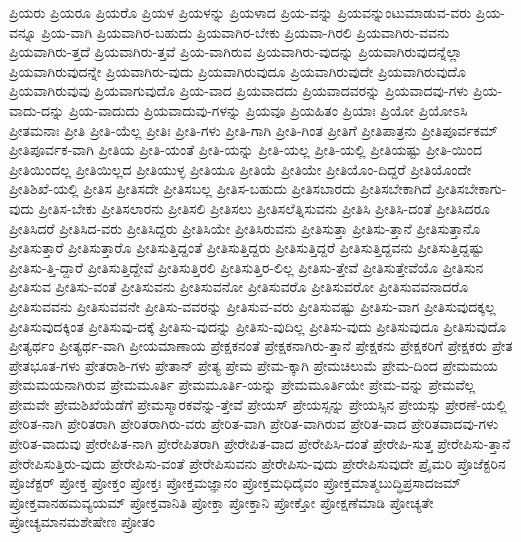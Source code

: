 {ಪ್ರಿಯರು
ಪ್ರಿಯರೂ
ಪ್ರಿಯರೊ
ಪ್ರಿಯಳ
ಪ್ರಿಯಳನ್ನು
ಪ್ರಿಯಳಾದ
ಪ್ರಿಯ-ವನ್ನು
ಪ್ರಿಯವನ್ನುಂಟುಮಾಡುವ-ವರು
ಪ್ರಿಯ-ವನ್ನೂ
ಪ್ರಿಯ-ವಾಗಿ
ಪ್ರಿಯವಾಗಿರ-ಬಹುದು
ಪ್ರಿಯವಾಗಿರ-ಬೇಕು
ಪ್ರಿಯವಾ-ಗಿರಲಿ
ಪ್ರಿಯವಾಗಿರು-ವವನು
ಪ್ರಿಯವಾಗಿರು-ತ್ತದೆ
ಪ್ರಿಯವಾಗಿರು-ತ್ತವೆ
ಪ್ರಿಯ-ವಾಗಿರುವ
ಪ್ರಿಯವಾಗಿರು-ವುದನ್ನು
ಪ್ರಿಯವಾಗಿರುವುದನ್ನೆಲ್ಲಾ
ಪ್ರಿಯವಾಗಿರುವುದನ್ನೇ
ಪ್ರಿಯವಾಗಿರು-ವುದು
ಪ್ರಿಯವಾಗಿರುವುದೂ
ಪ್ರಿಯವಾಗಿರುವುದೇ
ಪ್ರಿಯವಾಗಿರುವುದೊ
ಪ್ರಿಯವಾಗಿರುವುವು
ಪ್ರಿಯವಾಗುವುದೊ
ಪ್ರಿಯ-ವಾದ
ಪ್ರಿಯವಾದದು
ಪ್ರಿಯವಾದವರನ್ನು
ಪ್ರಿಯವಾದವು-ಗಳು
ಪ್ರಿಯ-ವಾದು-ದನ್ನು
ಪ್ರಿಯ-ವಾದುದು
ಪ್ರಿಯವಾದುವು-ಗಳನ್ನು
ಪ್ರಿಯವೂ
ಪ್ರಿಯಹಿತಂ
ಪ್ರಿಯಾಃ
ಪ್ರಿಯೋ
ಪ್ರಿಯೋಽಸಿ
ಪ್ರೀತಮನಾಃ
ಪ್ರೀತಿ
ಪ್ರೀತಿ-ಯೆಲ್ಲ
ಪ್ರೀತಿಃ
ಪ್ರೀತಿ-ಗಳು
ಪ್ರೀತಿ-ಗಾಗಿ
ಪ್ರೀತಿ-ಗಿಂತ
ಪ್ರೀತಿಗೆ
ಪ್ರೀತಿಪಾತ್ರನು
ಪ್ರೀತಿಪೂರ್ವಕಮ್
ಪ್ರೀತಿಪೂರ್ವಕ-ವಾಗಿ
ಪ್ರೀತಿಯ
ಪ್ರೀತಿ-ಯಂತೆ
ಪ್ರೀತಿ-ಯನ್ನು
ಪ್ರೀತಿ-ಯಲ್ಲ
ಪ್ರೀತಿ-ಯಲ್ಲಿ
ಪ್ರೀತಿಯಷ್ಟು
ಪ್ರೀತಿ-ಯಿಂದ
ಪ್ರೀತಿಯಿಂದಲ್ಲ
ಪ್ರೀತಿಯಿಲ್ಲದ
ಪ್ರೀತಿಯುಳ್ಳ
ಪ್ರೀತಿಯೂ
ಪ್ರೀತಿಯೆ
ಪ್ರೀತಿಯೇ
ಪ್ರೀತಿಯೊಂ-ದಿದ್ದರೆ
ಪ್ರೀತಿಯೊಂದೇ
ಪ್ರೀತಿಶಿಖೆ-ಯಲ್ಲಿ
ಪ್ರೀತಿಸ
ಪ್ರೀತಿಸದೇ
ಪ್ರೀತಿಸಬಲ್ಲ
ಪ್ರೀತಿಸ-ಬಹುದು
ಪ್ರೀತಿಸಬಾರದು
ಪ್ರೀತಿಸಬೇಕಾಗಿದೆ
ಪ್ರೀತಿಸಬೇಕಾಗು-ವುದು
ಪ್ರೀತಿಸ-ಬೇಕು
ಪ್ರೀತಿಸಲಾರನು
ಪ್ರೀತಿಸಲಿ
ಪ್ರೀತಿಸಲು
ಪ್ರೀತಿಸಲೆತ್ನಿಸುವನು
ಪ್ರೀತಿಸಿ
ಪ್ರೀತಿಸಿ-ದಂತೆ
ಪ್ರೀತಿಸಿದರೂ
ಪ್ರೀತಿಸಿದರೆ
ಪ್ರೀತಿಸಿದ-ವರು
ಪ್ರೀತಿಸಿದ್ದರು
ಪ್ರೀತಿಸಿಯೇ
ಪ್ರೀತಿಸಿರುವನು
ಪ್ರೀತಿಸುತ್ತಾ
ಪ್ರೀತಿಸು-ತ್ತಾನೆ
ಪ್ರೀತಿಸುತ್ತಾನೊ
ಪ್ರೀತಿಸುತ್ತಾರೆ
ಪ್ರೀತಿಸುತ್ತಾರೊ
ಪ್ರೀತಿಸುತ್ತಿದ್ದಂತೆ
ಪ್ರೀತಿಸುತ್ತಿದ್ದರು
ಪ್ರೀತಿಸುತ್ತಿದ್ದರೆ
ಪ್ರೀತಿಸುತ್ತಿದ್ದವನು
ಪ್ರೀತಿಸುತ್ತಿದ್ದಷ್ಟು
ಪ್ರೀತಿಸು-ತ್ತಿ-ದ್ದಾರೆ
ಪ್ರೀತಿಸುತ್ತಿದ್ದೇವೆ
ಪ್ರೀತಿಸುತ್ತಿರಲಿ
ಪ್ರೀತಿಸುತ್ತಿರ-ಲಿಲ್ಲ
ಪ್ರೀತಿಸು-ತ್ತೇವೆ
ಪ್ರೀತಿಸುತ್ತೇವೆಯೊ
ಪ್ರೀತಿಸುನ
ಪ್ರೀತಿಸುವ
ಪ್ರೀತಿಸು-ವಂತೆ
ಪ್ರೀತಿಸುವನು
ಪ್ರೀತಿಸುವನೋ
ಪ್ರೀತಿಸುವರೊ
ಪ್ರೀತಿಸುವರೋ
ಪ್ರೀತಿಸುವವನಾದರೊ
ಪ್ರೀತಿಸುವವನು
ಪ್ರೀತಿಸುವವನೇ
ಪ್ರೀತಿಸು-ವವರನ್ನು
ಪ್ರೀತಿಸುವ-ವರು
ಪ್ರೀತಿಸುವಷ್ಟು
ಪ್ರೀತಿಸು-ವಾಗ
ಪ್ರೀತಿಸುವುದಕ್ಕಲ್ಲ
ಪ್ರೀತಿಸುವುದಕ್ಕಿಂತ
ಪ್ರೀತಿಸುವು-ದಕ್ಕೆ
ಪ್ರೀತಿಸು-ವುದನ್ನು
ಪ್ರೀತಿಸು-ವುದಿಲ್ಲ
ಪ್ರೀತಿಸು-ವುದು
ಪ್ರೀತಿಸುವುದೂ
ಪ್ರೀತಿಸುವುದೊ
ಪ್ರೀತ್ಯರ್ಥಂ
ಪ್ರೀತ್ಯರ್ಥ-ವಾಗಿ
ಪ್ರೀಯಮಾಣಾಯ
ಪ್ರೇಕ್ಷಕನಂತೆ
ಪ್ರೇಕ್ಷಕನಾಗಿರು-ತ್ತಾನೆ
ಪ್ರೇಕ್ಷಕನು
ಪ್ರೇಕ್ಷಕರಿಗೆ
ಪ್ರೇಕ್ಷಕರು
ಪ್ರೇತ
ಪ್ರೇತಭೂತ-ಗಳು
ಪ್ರೇತರಾಶಿ-ಗಳು
ಪ್ರೇತಾನ್
ಪ್ರೇತ್ಯ
ಪ್ರೇಮ
ಪ್ರೇಮ-ಕ್ಕಾಗಿ
ಪ್ರೇಮಚಿಲುಮೆ
ಪ್ರೇಮ-ದಿಂದ
ಪ್ರೇಮಮಯ
ಪ್ರೇಮಮಯನಾಗಿರುವ
ಪ್ರೇಮಮೂರ್ತಿ
ಪ್ರೇಮಮೂರ್ತಿ-ಯನ್ನು
ಪ್ರೇಮಮೂರ್ತಿಯೇ
ಪ್ರೇಮ-ವನ್ನು
ಪ್ರೇಮವೆಲ್ಲ
ಪ್ರೇಮವೇ
ಪ್ರೇಮಶಿಖೆಯೆಡೆಗೆ
ಪ್ರೇಮಸ್ಮಾರಕವೆನ್ನು-ತ್ತೇವೆ
ಪ್ರೇಯಸ್
ಪ್ರೇಯಸ್ಸನ್ನು
ಪ್ರೇಯಸ್ಸಿನ
ಪ್ರೇಯಸ್ಸು
ಪ್ರೇರಣೆ-ಯಲ್ಲಿ
ಪ್ರೇರಿತ-ನಾಗಿ
ಪ್ರೇರಿತರಾಗಿ
ಪ್ರೇರಿತರಾಗಿರು-ವರು
ಪ್ರೇರಿತ-ವಾಗಿ
ಪ್ರೇರಿತ-ವಾಗಿರುವ
ಪ್ರೇರಿತ-ವಾದ
ಪ್ರೇರಿತವಾದವು-ಗಳು
ಪ್ರೇರಿತ-ವಾದುವು
ಪ್ರೇರೇಪಿತ-ನಾಗಿ
ಪ್ರೇರೇಪಿತರಾಗಿ
ಪ್ರೇರೇಪಿತ-ವಾದ
ಪ್ರೇರೇಪಿಸಿ-ದಂತೆ
ಪ್ರೇರೇಪಿ-ಸುತ್ತ
ಪ್ರೇರೇಪಿಸು-ತ್ತಾನೆ
ಪ್ರೇರೇಪಿಸುತ್ತಿರು-ವುದು
ಪ್ರೇರೇಪಿಸು-ವಂತೆ
ಪ್ರೇರೇಪಿಸುವನು
ಪ್ರೇರೇಪಿಸು-ವುದು
ಪ್ರೇರೇಪಿಸುವುದೇ
ಪ್ರೈಮರಿ
ಪ್ರೊಜೆಕ್ಟರಿನ
ಪ್ರೊಜೆಕ್ಟರ್
ಪ್ರೋಕ್ತ
ಪ್ರೋಕ್ತಂ
ಪ್ರೋಕ್ತಃ
ಪ್ರೋಕ್ತಮಜ್ಞಾನಂ
ಪ್ರೋಕ್ತಮಧಿದೈವಂ
ಪ್ರೋಕ್ತಮಾತ್ಮಬುದ್ಧಿಪ್ರಸಾದಜಮ್
ಪ್ರೋಕ್ತವಾನಹಮವ್ಯಯಮ್
ಪ್ರೋಕ್ತವಾನಿತಿ
ಪ್ರೋಕ್ತಾ
ಪ್ರೋಕ್ತಾನಿ
ಪ್ರೋಕ್ತೋ
ಪ್ರೋಕ್ಷಣೆಮಾಡಿ
ಪ್ರೋಚ್ಯತೇ
ಪ್ರೋಚ್ಯಮಾನಮಶೇಷೇಣ
ಪ್ರೋತಂ
}
